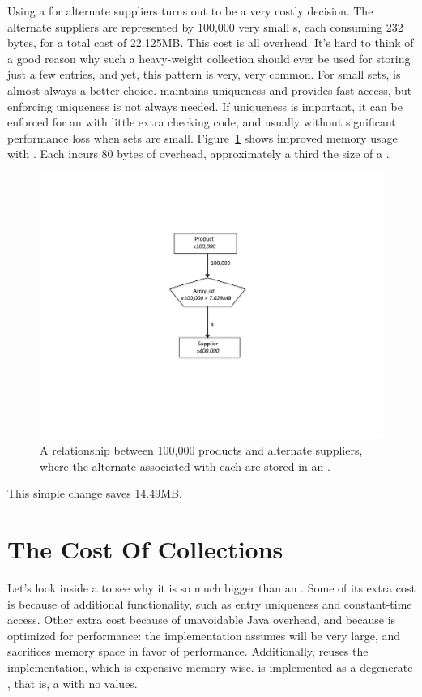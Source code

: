 Using a  for alternate suppliers turns out to be a
very costly decision. The alternate suppliers are represented by 100,000
very small s, each consuming 232 bytes, for a total cost of 22.125MB. 
This cost is all overhead.
It's hard to think of a good reason why such a heavy-weight collection should ever be used
 for storing just a few entries, and yet, this pattern is very, very common. For
 small sets,  is almost always a better choice.  maintains uniqueness
  and provides fast access, but enforcing uniqueness
is not always needed. If uniqueness is
important, it can be enforced for an  
 with  little extra checking code, and usually without significant performance
 loss when sets are small. Figure~\ref{fig:product-arraylist} shows improved
 memory usage with . Each  incurs 80 bytes of overhead,
approximately a third the size of a .
 \begin{figure}
  \centering
 \includegraphics[width=.80\textwidth]{part1/Figures/collections/product-arraylist.pdf}
 \caption{A relationship between 100,000 products and alternate suppliers,
 where the alternate  associated with each  are
 stored in an .}
  \label{fig:product-arraylist}
\end{figure}
This simple change saves 14.49MB. 


\section{The Cost Of Collections}
\label{sec:collectioncost}
Let's look inside a  to see why it is so much bigger than an
. Some of its extra cost is because of additional
functionality, such as entry uniqueness and constant-time access. Other extra
cost because of unavoidable Java overhead, and because
 is optimized for performance: the  implementation
assumes  will be very large, and sacrifices memory space in favor of performance. 
Additionally,  reuses the  implementation, which
is expensive memory-wise.  is implemented as a degenerate
, that is, a  with no values. 

